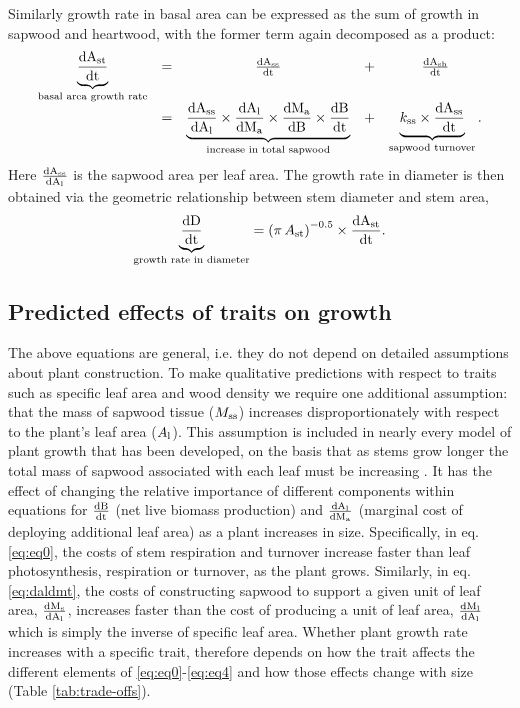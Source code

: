 \documentclass[a4paper,11pt]{article}
\begin{document}
Similarly growth rate in basal area can be expressed as the sum of growth in sapwood and heartwood, with the former term again decomposed as a product:
\begin{equation}\label{eq:eq3}
\begin{array}{ccccc}
\underbrace{{\frac{\rm{d} A_{\rm st}}{\rm{d} t}}}_{\text{basal area growth rate}} &=& \frac{\rm{d} A_{\rm ss}}{\rm{d} t} &+& \frac{\rm{d} A_{\rm sh}}{\rm{d} t} \\
&=& \underbrace{\frac{\rm{d} A_{\rm ss}}{\rm{d} A_{\rm l}}  \times {\frac{\ensuremath{\rm{d}}A_{\rm l}}{\ensuremath{\rm{d}}M_{\rm a} }} \times  {\frac{\ensuremath{\rm{d}}M_{\rm a} }{\ensuremath{\rm{d}}B}} \times {\frac{\ensuremath{\rm{d}}B}{\ensuremath{\rm{d}}t}}}_{\text{increase in total sapwood}} &+&  \underbrace{k_{\rm ss} \times \frac{\rm{d} A_{\rm ss}}{\rm{d} t}}_{\text{sapwood turnover}}.\\
\end{array}
\end{equation}
Here $\frac{\rm{d} A_{\rm ss}}{\rm{d} A_{\rm l}} $ is the  sapwood area per leaf area. The growth rate in diameter is then obtained via the geometric relationship between stem diameter and stem area,
\begin{equation}\label{eq:eq4}
\underbrace{\frac{\rm{d} D}{\rm{d} t}}_{\text{growth rate in diameter}} = \left(\pi \, A_{\rm st}\right)^{-0.5} \times {\frac{\ensuremath{\rm{d}}A_{\rm st}}{\ensuremath{\rm{d}}t}}.
\end{equation}

\subsection*{Predicted effects of traits on growth}

The above equations are general, i.e. they do not depend on detailed assumptions about plant construction. To make qualitative predictions with respect to traits such as specific leaf area and wood density we require one additional assumption: that the mass of sapwood tissue ($M_{\rm ss}$) increases disproportionately with respect to the plant's leaf area ($A_{\rm l}$). This assumption is included in nearly every model of plant growth that has been developed, on the basis that as stems grow longer the total mass of sapwood associated with each leaf must be increasing \citep[e.g.][]{King-1999,Enquist:2007ek,Falster:2011ii}. It has the effect of changing the relative importance of different components within equations for $\frac{\rm{d} B}{\rm{d} t}$ (net live biomass production) and $\frac{\rm{d} A_{\rm l}}{\rm{d} M_{\rm a} }$ (marginal cost of deploying additional leaf area) as a plant increases in size. Specifically, in eq. \ref{eq:eq0}, the costs of stem respiration and turnover increase faster than leaf photosynthesis, respiration or turnover, as the plant grows. Similarly, in eq. \ref{eq:daldmt}, the costs of constructing sapwood to support a given unit of leaf area, $\frac{\rm{d} M_{\rm s}}{\rm{d} A_{\rm l}}$, increases faster than the cost of producing a unit of leaf area, $\frac{\rm{d} M_{\rm l}}{\rm{d} A_{\rm l}}$ which is simply the inverse of specific leaf area. Whether plant growth rate increases with a specific trait, therefore depends on how the trait affects the different elements of \ref{eq:eq0}-\ref{eq:eq4} and how those effects change with size (Table \ref{tab:trade-offs}).
\end{document}
